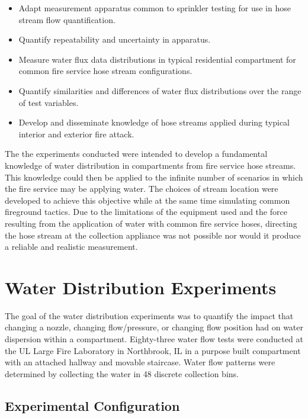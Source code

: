 \documentclass[12pt,oneside]{book}
\begin{document}
\begin{itemize}
	\setlength{\itemindent}{0.25in}
	\item Adapt measurement apparatus common to sprinkler testing for use in hose stream flow quantification.
	\item Quantify repeatability and uncertainty in apparatus.
	\item Measure water flux data distributions in typical residential compartment for common fire service hose stream configurations.
	\item Quantify similarities and differences of water flux distributions over the range of test variables.
	\item Develop and disseminate knowledge of hose streams applied during typical interior and exterior fire attack.
	\end{itemize}

The the experiments conducted were intended to develop a fundamental knowledge of water distribution in compartments from fire service hose streams. This knowledge could then be applied to the infinite number of scenarios in which the fire service may be applying water. The choices of stream location were developed to achieve this objective while at the same time simulating common fireground tactics. Due to the limitations of the equipment used and the force resulting from the application of water with common fire service hoses, directing the hose stream at the collection appliance was not possible nor would it produce a reliable and realistic measurement. 

\chapter{Water Distribution Experiments}

The goal of the water distribution experiments was to quantify the impact that changing a nozzle, changing flow/pressure, or changing flow position had on water dispersion within a compartment. Eighty-three water flow tests were conducted at the UL Large Fire Laboratory in Northbrook, IL in a purpose built compartment with an attached hallway and movable staircase. Water flow patterns were determined by collecting the water in 48 discrete collection bins.

\section{Experimental Configuration}
\end{document}
